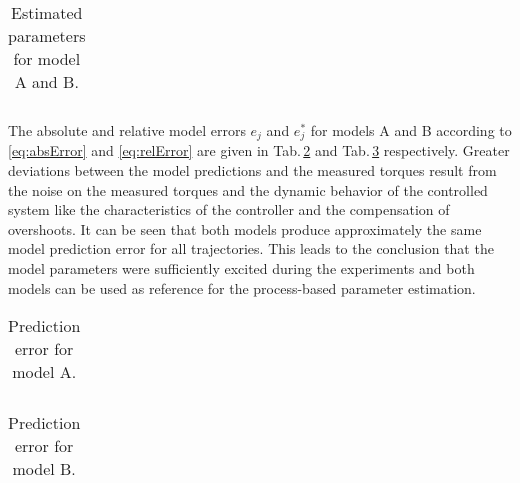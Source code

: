 \begin{table}
	\caption{Estimated parameters for model A and B.}\label{tab:ParamTheta}
	\centering
	\begin{tabular}[h]{|r||c|c||c|c|}\hline
		
		\hline
	\end{tabular}
\end{table}

The absolute and relative model errors $e_{j}$ and $e^*_{j}$ for models A and B according to \eqref{eq:absError} and \eqref{eq:relError} are given in Tab.\,\ref{tab:errorModelA} and Tab.\,\ref{tab:errorModelB} respectively. Greater deviations between the model predictions and the measured torques result from the noise on the measured torques and the dynamic behavior of the controlled system like the characteristics of the controller and the compensation of overshoots. It can be seen that both models produce approximately the same model prediction error for all trajectories. This leads to the conclusion that the model parameters were sufficiently excited during the experiments and both models can be used as reference for the process-based parameter estimation.

\begin{table}
	\caption{Prediction error for model A.}\label{tab:errorModelA}
	\centering
	\begin{tabular}[h]{|r||c|c||c|c|}\hline
		
		\hline
	\end{tabular}
\end{table}

\begin{table}
	\caption{Prediction error for model B.}\label{tab:errorModelB}
	\centering
	\begin{tabular}[h]{|r||c|c||c|c|}\hline
		
		\hline
	\end{tabular}
\end{table}